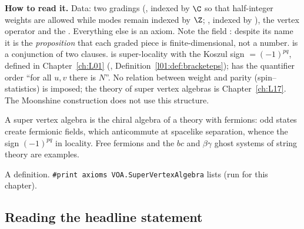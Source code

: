 \begin{dictionary}
\textbf{How to read it.} Data: two gradings (, indexed by $\C$ so that half-integer
weights are allowed while modes remain indexed by $\Z$; , indexed by ), the
vertex operator  and the . Everything else is an axiom. Note the field
: despite its name it is the \emph{proposition} that each graded piece is
finite-dimensional, not a number.  is a conjunction  of two clauses.
 is super-locality with the Koszul sign  $=(-1)^{pq}$, defined in
Chapter~\ref{ch:L01} (, Definition~\ref{l01:def:bracketeps});  has the
quantifier order ``for all $u,v$ there is $N$''. No relation between weight and parity
(spin--statistics) is imposed; the theory of super vertex algebras is Chapter~\ref{ch:L17}. The
Moonshine construction does not use this structure.
\end{dictionary}

\begin{physics}
A super vertex algebra is the chiral algebra of a theory with fermions: odd states create fermionic
fields, which anticommute at spacelike separation, whence the sign $(-1)^{pq}$ in locality. Free
fermions and the $bc$ and $\beta\gamma$ ghost systems of string theory are examples.
\end{physics}

\begin{status}
A definition. \texttt{\#print axioms VOA.SuperVertexAlgebra} lists
 (run for this chapter).
\end{status}

\subsection{Reading the headline statement}\label{ch01:sec:headline}

